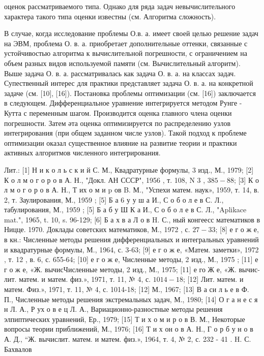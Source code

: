 \documentclass[10pt]{article}
\begin{document}
оценок рассматриваемого типа. Однако для ряда задач невычислительного характера такого типа оценки известны (см. Алгоритма сложность).

В случае, когда исследование проблемы О.в. а. имеет своей целью решение задач на ЭВМ, проблема О. в. а. приобретает дополнительные оттенки, связанные с устойчивостью алгоритма к вычислительной погрешности, с ограничением на объем разных видов используемой памяти (см. Вычислительный алгоритм). Выше задача О. в. а. рассматривалась как задача О. в. а. на классах задач. Супественный интерес для практики представляет задача О. в. а. на конкретной задаче (см. [10], [16]). Постановка проблемы оптимизации (см. [16]) заключается в следующем. Дифференциальное уравнение интегрируется методом Рунге - Кутта с переменным шагом. Производится оценка главного члена оценки погрешности. Затем әта оценка оптимизируется по распределению узлов интегрирования (при общем заданном числе узлов). Такой подход к проблеме оптимизации оказал существенное влияние на развитие теории и практики активных алгоритмов численного интегрирования.

Лит.: [1] Н и к о л ь с к и й С. М., Квадратурные формулы, 3 изд., М., 1979; [2] К о л м о г о р о в А. Н., "Докл. АН СССР", 1956 , т. 108, N 3 , $385-88$; [3] К о л м о г о р о в А. Н., Т их о м и $\mathrm{p}$ ов B. М., "Успехи матем. наук», 1959, т. 14, в. 2, т. Заулирования, М., 1959 ; [5] Б а 6 у у $ш$ а И., С о б о л е в С. Л., табулирования, М., 1959 ; [5] Б а б у Ш К а И., С о б о л е в С. Л., "Aplikace mat.", 1965, t. 10, s. 96-129; [6] Б а х в а Л о в H. С., ный конгеесс математиков в Ницце. 1970. Доклады советских математиков, М., 1972 , с. $27-33$; [8] е г о ж е, в кн.: Численные методы решения дифференциальных и интегральных уравнений и квадратурные формулы, М., 1964, с. 3-63; [9] е г о ж е, «Матем. заметки», 1972 , т. 12 , в. 6, с. 655-64; [10] е г о ж е, Численные методы, 2 изд., М., 1975 ; [11] е г о ж е, «Ж. вычисЧисленные методы, 2 изд., М., 1975; [11] е го Ж е, «Ж. вычис-
лит. матем. и матем. физ.», 1971, т. 11, № 4, с. $1014-18$; [12] Лит. матем. и матем. Физ.», 1971, т. 11, № 4, с. 1014-18; [12] М., 1967; [13] В а си л ь е в Ф. П., Численные методы решения экстремальных задач, М., 1980; [14] О г а н е с я н Л. А., Р ух о в е ц Л. А., Вариационно-разностные методы решения элпиптических уравнений, Ер., 1979; [15] Т и х о м и р о в В. М., Некоторые вопросы теории приближений, М., 1976; [16] Т и х он о в А. Н., Г о р б у н о в А. Д., “Ж. вычислит. матем. и матем. физ.», 1964, т. 4, № 2, с. 232 - 41 . H. С. Бахвалов
\end{document}
